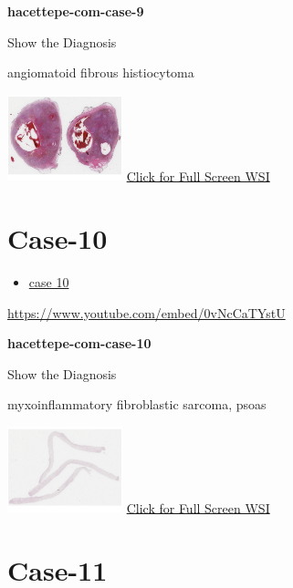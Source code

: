 \documentclass[
  letterpaper,
  paper=6in:9in,
  pagesize=pdftex,
  headinclude=on,
  footinclude=on,
  12pt]{scrbook}
\providecommand{\tightlist}{%
  \setlength{\itemsep}{0pt}\setlength{\parskip}{0pt}}\usepackage{longtable,booktabs,array}
\begin{document}
\textbf{hacettepe-com-case-9}

Show the Diagnosis

\hypertarget{answer9}{}
angiomatoid fibrous histiocytoma

\href{https://images.patolojiatlasi.com/hacettepe-com-case-9/HE.html}{\includegraphics[width=0.25\textwidth,height=\textheight]{./screenshots/hacettepe-com-case-9_screenshot.png}}
\href{https://images.patolojiatlasi.com/hacettepe-com-case-9/HE.html}{Click
for Full Screen WSI}

\hypertarget{sec-hacettepe-case-of-the-month-case-10}{%
\section{Case-10}\label{sec-hacettepe-case-of-the-month-case-10}}

\begin{itemize}
\tightlist
\item
  \href{https://www.youtube.com/watch?v=0vNcCaTYstU\&ab_channel=KemalKosemehmetoglu}{case
  10}
\end{itemize}

\url{https://www.youtube.com/embed/0vNcCaTYstU}

\textbf{hacettepe-com-case-10}

Show the Diagnosis

\hypertarget{answer10}{}
myxoinflammatory fibroblastic sarcoma, psoas

\href{https://images.patolojiatlasi.com/hacettepe-com-case-10/HE.html}{\includegraphics[width=0.25\textwidth,height=\textheight]{./screenshots/hacettepe-com-case-10_screenshot.png}}
\href{https://images.patolojiatlasi.com/hacettepe-com-case-10/HE.html}{Click
for Full Screen WSI}

\hypertarget{sec-hacettepe-case-of-the-month-case-11}{%
\section{Case-11}\label{sec-hacettepe-case-of-the-month-case-11}}
\end{document}
